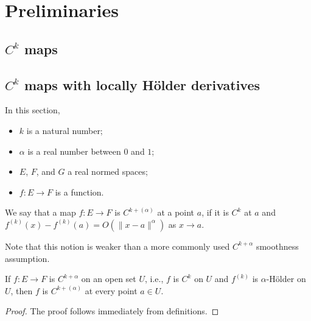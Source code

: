 %

\chapter{Preliminaries}%
\label{cha:preliminaries}
\section{\(C^k\) maps}%
\label{sec:ck-maps}

\section{\(C^{k}\) maps with locally Hölder derivatives}

In this section,
\begin{itemize}
\item \(k\) is a natural number;
\item \(\alpha\) is a real number between \(0\) and \(1\);
\item \(E\), \(F\), and \(G\) a real normed spaces;
\item \(f\colon E \to F\) is a function.
\end{itemize}

\begin{definition}%
  \label{def:cdh-at}
  We say that a map \(f\colon E\to F\) is \emph{\(C^{k+(\alpha)}\)} at a point \(a\),
  if it is \(C^{k}\) at \(a\) and \(f^{(k)}(x) - f^{(k)}(a) = O(\|x - a\|^{\alpha})\) as \(x\to a\).
\end{definition}

Note that this notion is weaker than a more commonly used \(C^{k+\alpha}\) smoothness assumption.
\begin{lemma}%
  \label{def:contdiffholder-imp-cdh-at}
  If \(f\colon E \to F\) is \(C^{k+\alpha}\) on an open set \(U\),
  i.e., \(f\) is \(C^{k}\) on \(U\) and \(f^{(k)}\) is \(\alpha\)-Hölder on \(U\),
  then \(f\) is \(C^{k+(\alpha)}\) at every point \(a \in U\).
\end{lemma}
\begin{proof}
  The proof follows immediately from definitions.
\end{proof}

